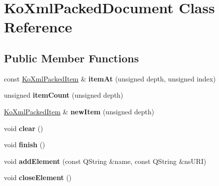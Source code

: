 \hypertarget{classKoXmlPackedDocument}{
\section{KoXmlPackedDocument Class Reference}
\label{classKoXmlPackedDocument}
}
\subsection*{Public Member Functions}
\begin{DoxyCompactItemize}
\item 
\hypertarget{classKoXmlPackedDocument_a268a60d48ce7ce0fdf893e730eb0ddc2}{
const \hyperlink{classKoXmlPackedItem}{KoXmlPackedItem} \& {\bfseries itemAt} (unsigned depth, unsigned index)}
\label{classKoXmlPackedDocument_a268a60d48ce7ce0fdf893e730eb0ddc2}

\item 
\hypertarget{classKoXmlPackedDocument_a81fe135e276a6ee45ac006eabc428488}{
unsigned {\bfseries itemCount} (unsigned depth)}
\label{classKoXmlPackedDocument_a81fe135e276a6ee45ac006eabc428488}

\item 
\hypertarget{classKoXmlPackedDocument_ade98ff16e575fa022a40c857abef6a06}{
\hyperlink{classKoXmlPackedItem}{KoXmlPackedItem} \& {\bfseries newItem} (unsigned depth)}
\label{classKoXmlPackedDocument_ade98ff16e575fa022a40c857abef6a06}

\item 
\hypertarget{classKoXmlPackedDocument_a0dc2825a58a16a3b5f7c3349cf70b9b1}{
void {\bfseries clear} ()}
\label{classKoXmlPackedDocument_a0dc2825a58a16a3b5f7c3349cf70b9b1}

\item 
\hypertarget{classKoXmlPackedDocument_a23dd375c5eb8c08ba9e46bcd51d1b96b}{
void {\bfseries finish} ()}
\label{classKoXmlPackedDocument_a23dd375c5eb8c08ba9e46bcd51d1b96b}

\item 
\hypertarget{classKoXmlPackedDocument_aec74e517a2196da0aa4c4571d07523e6}{
void {\bfseries addElement} (const QString \&name, const QString \&nsURI)}
\label{classKoXmlPackedDocument_aec74e517a2196da0aa4c4571d07523e6}

\item 
\hypertarget{classKoXmlPackedDocument_acd3d450ebb5877d5c5d52ff7eadeaaf3}{
void {\bfseries closeElement} ()}
\label{classKoXmlPackedDocument_acd3d450ebb5877d5c5d52ff7eadeaaf3}


\end{DoxyCompactItemize}
